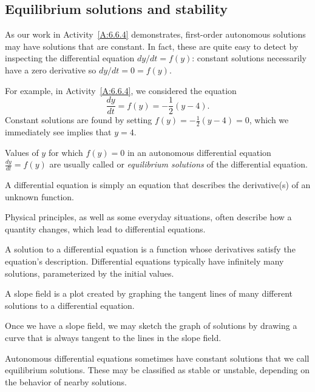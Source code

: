 
\subsection*{Equilibrium solutions and stability} 

As our work in Activity~\ref{A:6.6.4} demonstrates, first-order autonomous
solutions may have solutions that are constant.  In fact, these are
quite easy to detect by inspecting the differential equation $dy/dt =
f(y)$:  constant solutions necessarily have a zero derivative so 
$dy/dt = 0 = f(y)$.  

For example, in Activity~\ref{A:6.6.4}, we considered the
equation
$$
\frac{dy}{dt} = f(y)=-\frac12(y-4).
$$
Constant solutions are found by setting $f(y) = -\frac12(y-4) = 0$,
which we immediately see implies that $y = 4$.  

Values of $y$ for which $f(y) = 0$ in an autonomous differential equation $\frac{dy}{dt} = f(y)$ are usually called or {\em equilibrium solutions}  of the differential
equation.  


\begin{summary}
\item A differential equation is simply an equation that describes the
  derivative(s) of an unknown function.
\item Physical principles, as well as some everyday situations, often
  describe how a quantity changes, which 
  lead to differential equations.
\item A solution to a differential equation is a function whose
  derivatives satisfy the equation's description.  Differential
  equations typically have infinitely many solutions, 
  parameterized by the initial values.
\item A slope field is a plot created by graphing the tangent lines of
  many different solutions to a differential equation.
\item Once we have a slope field, we may sketch the graph of solutions
  by drawing a curve that is always tangent to the lines in the slope
  field. 
\item Autonomous differential equations sometimes have constant
  solutions that we call 
  equilibrium solutions.  These may be classified as stable or
  unstable, depending on the behavior of nearby solutions.  
\end{summary}

\clearpage

 

\cleardoublepage
